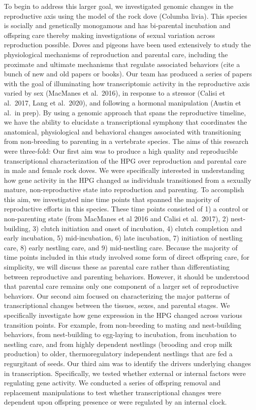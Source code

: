 To begin to address this larger goal, we investigated genomic changes in
the reproductive axis using the model of the rock dove (Columba livia).
This species is socially and genetically monogamous and has bi-parental
incubation and offspring care thereby making investigations of sexual
variation across reproduction possible. Doves and pigeons have been used
extensively to study the physiological mechanisms of reproduction and
parental care, including the proximate and ultimate mechanisms that
regulate associated behaviors (cite a bunch of new and old papers or
books). Our team has produced a series of papers with the goal of
illuminating how transcriptomic activity in the reproductive axis varied
by sex (MacManes et al.~2016), in response to a stressor (Calisi et
al.~2017, Lang et al.~2020), and following a hormonal manipulation
(Austin et al.~in prep). By using a genomic approach that spans the
reproductive timeline, we have the ability to elucidate a
transcriptional symphony that coordinates the anatomical, physiological
and behavioral changes associated with transitioning from non-breeding
to parenting in a vertebrate species. The aims of this research were
three-fold: Our first aim was to produce a high quality and reproducible
transcriptional characterization of the HPG over reproduction and
parental care in male and female rock doves. We were specifically
interested in understanding how gene activity in the HPG changed as
individuals transitioned from a sexually mature, non-reproductive state
into reproduction and parenting. To accomplish this aim, we investigated
nine time points that spanned the majority of reproductive efforts in
this species. These time points consisted of 1) a control or
non-parenting state (from MacManes et al 2016 and Calisi et al.~2017),
2) nest-building, 3) clutch initiation and onset of incubation, 4)
clutch completion and early incubation, 5) mid-incubation, 6) late
incubation, 7) initiation of nestling care, 8) early nestling care, and
9) mid-nestling care. Because the majority of time points included in
this study involved some form of direct offspring care, for simplicity,
we will discuss these as parental care rather than differentiating
between reproductive and parenting behaviors. However, it should be
understood that parental care remains only one component of a larger set
of reproductive behaviors. Our second aim focused on characterizing the
major patterns of transcriptional changes between the tissues, sexes,
and parental stages. We specifically investigate how gene expression in
the HPG changed across various transition points. For example, from
non-breeding to mating and nest-building behaviors, from nest-building
to egg-laying to incubation, from incubation to nestling care, and from
highly dependent nestlings (brooding and crop milk production) to older,
thermoregulatory independent nestlings that are fed a regurgitant of
seeds. Our third aim was to identify the drivers underlying changes in
transcription. Specifically, we tested whether external or internal
factors were regulating gene activity. We conducted a series of
offspring removal and replacement manipulations to test whether
transcriptional changes were dependent upon offspring presence or were
regulated by an internal clock.

